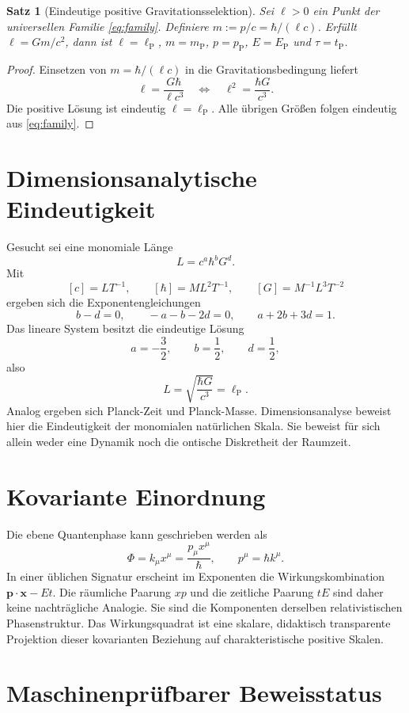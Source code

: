 \documentclass[11pt,a4paper]{article}
\newtheorem{satz}{Satz}
\newcommand{\lP}{\ell_{\mathrm P}}
\newcommand{\tP}{t_{\mathrm P}}
\newcommand{\mP}{m_{\mathrm P}}
\newcommand{\pP}{p_{\mathrm P}}
\newcommand{\EP}{E_{\mathrm P}}
\begin{document}
\begin{satz}[Eindeutige positive Gravitationsselektion]
Sei $\ell>0$ ein Punkt der universellen Familie \eqref{eq:family}. Definiere
$m:=p/c=\hbar/(\ell c)$. Erfüllt $\ell=Gm/c^2$, dann ist
$\ell=\lP$, $m=\mP$, $p=\pP$, $E=\EP$ und $\tau=\tP$.
\end{satz}

\begin{proof}
Einsetzen von $m=\hbar/(\ell c)$ in die Gravitationsbedingung liefert
\[
 \ell=\frac{G\hbar}{\ell c^3}
 \quad\Longleftrightarrow\quad
 \ell^2=\frac{\hbar G}{c^3}.
\]
Die positive Lösung ist eindeutig $\ell=\lP$. Alle übrigen Größen folgen
eindeutig aus \eqref{eq:family}.
\end{proof}

\section{Dimensionsanalytische Eindeutigkeit}

Gesucht sei eine monomiale Länge
\[
 L=c^a\hbar^bG^d.
\]
Mit
\[
 [c]=LT^{-1},\qquad [\hbar]=ML^2T^{-1},\qquad
 [G]=M^{-1}L^3T^{-2}
\]
ergeben sich die Exponentengleichungen
\[
 b-d=0,\qquad -a-b-2d=0,\qquad a+2b+3d=1.
\]
Das lineare System besitzt die eindeutige Lösung
\[
 a=-\frac32,\qquad b=\frac12,\qquad d=\frac12,
\]
also
\[
 L=\sqrt{\frac{\hbar G}{c^3}}=\lP.
\]
Analog ergeben sich Planck-Zeit und Planck-Masse. Dimensionsanalyse beweist
hier die Eindeutigkeit der monomialen natürlichen Skala. Sie beweist für sich
allein weder eine Dynamik noch die ontische Diskretheit der Raumzeit.

\section{Kovariante Einordnung}

Die ebene Quantenphase kann geschrieben werden als
\[
 \Phi=k_\mu x^\mu=\frac{p_\mu x^\mu}{\hbar},
 \qquad p^\mu=\hbar k^\mu.
\]
In einer üblichen Signatur erscheint im Exponenten die Wirkungskombination
$\mathbf p\!\cdot\!\mathbf x-Et$. Die räumliche Paarung $x p$ und die
zeitliche Paarung $tE$ sind daher keine nachträgliche Analogie. Sie sind die
Komponenten derselben relativistischen Phasenstruktur. Das Wirkungsquadrat ist
eine skalare, didaktisch transparente Projektion dieser kovarianten Beziehung
auf charakteristische positive Skalen.

\section{Maschinenprüfbarer Beweisstatus}
\end{document}
